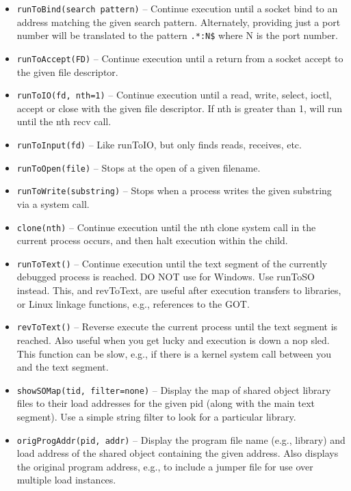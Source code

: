 \documentclass[titlepage]{article}
\begin{document}
\begin{itemize}
\item {\tt runToBind(search pattern)} – Continue execution until a socket bind to an address matching the given search pattern.  Alternately, providing just
a port number will be translated to the pattern {\tt .*:N\$} where N is the port number.

\item {\tt runToAccept(FD)} – Continue execution until a return from a socket accept to the given file descriptor.

\item {\tt runToIO(fd, nth=1)} – Continue execution until a read, write, select, ioctl, accept or close with the given file descriptor.  
If nth is greater than 1, will run until the nth recv call.  

\item {\tt runToInput(fd)} -- Like runToIO, but only finds reads, receives, etc.

\item {\tt runToOpen(file)} -- Stops at the open of a given filename.

\item {\tt runToWrite(substring)} -- Stops when a process writes the given substring via a system call.

\item {\tt clone(nth)} – Continue execution until the nth clone system call in the current process occurs, and then halt execution within the child.

\item {\tt runToText()} – Continue execution until the text segment of the currently debugged process is reached.  DO NOT use for Windows.  Use runToSO instead. 
This, and revToText, are useful after execution transfers to libraries, or Linux linkage functions, e.g., references to the GOT.

\item {\tt revToText()} – Reverse execute the current process until the text segment is reached.  Also useful when you get lucky and execution is down a nop sled.  This function can be slow, e.g., if there is a kernel system call between you and the text segment.
 
\item {\tt showSOMap(tid, filter=none)} – Display the map of shared object library files to their load addresses for the given pid (along with the main text segment).
Use a simple string filter to look for a particular library.

\item {\tt origProgAddr(pid, addr)} – Display the program file name (e.g., library) and load address of the shared object containing the given address.  Also displays the 
original program address, e.g., to include a jumper file for use over multiple load instances.


\end{itemize}
\end{document}
